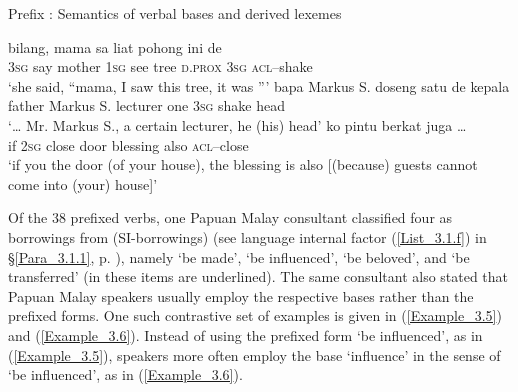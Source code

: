 \newpage
\begin{styleExampleTitle}
{Prefix : Semantics of  verbal bases and derived lexemes}
\end{styleExampleTitle}

\ea
\label{Example_3.2}
 {bilang,} {mama} {sa} {liat} {pohong} {ini} {de} {}\\ %
 \textsc{3sg}  say  mother  \textsc{1sg}  see  tree  \textsc{d.prox}  \textsc{3sg}  \textsc{acl}–shake\\
\glt 
‘she said, ``mama, I saw this tree, it was ''' \textstyleExampleSource{[080917-008-NP.0031]}
\z
\ea
\label{Example_3.3}
\gll {\ldots} {bapa} {Markus} {S.} {doseng} {satu} {de} {} {kepala}\\ %
{}   father  Markus  S.  lecturer  one  \textsc{3sg}  shake  head\\
\glt 
‘{\ldots} Mr. Markus S., a certain lecturer, he  (his) head’ \textstyleExampleSource{[080917-010-CvEx.0194]}
\z
\ea
\label{Example_3.4}
 {ko} {} {pintu} {berkat} {juga} {} {\ldots}\\ %
 if  \textsc{2sg}  close  door  blessing  also  \textsc{acl}–close  \\
\glt 
‘if you  the door (of your house), the blessing is also  [(because) guests cannot come into (your) house]’ \textstyleExampleSource{[081110-008-CvNP.0096]}
\z


Of the 38 prefixed  verbs, one Papuan Malay consultant classified four as borrowings from  (SI-borrowings) (see language internal factor (\ref{List_3.1.f}) in §\ref{Para_3.1.1}, p. \pageref{List_3.1.f}), namely  ‘be made’,  ‘be influenced’,  ‘be beloved’, and  ‘be transferred’ (in  these items are underlined). The same consultant also stated that Papuan Malay speakers usually employ the respective bases rather than the prefixed forms. One such contrastive set of examples is given in (\ref{Example_3.5}) and (\ref{Example_3.6}). Instead of using the prefixed form  ‘be influenced’, as in (\ref{Example_3.5}), speakers more often employ the base  ‘influence’ in the sense of ‘be influenced’, as in (\ref{Example_3.6}).


